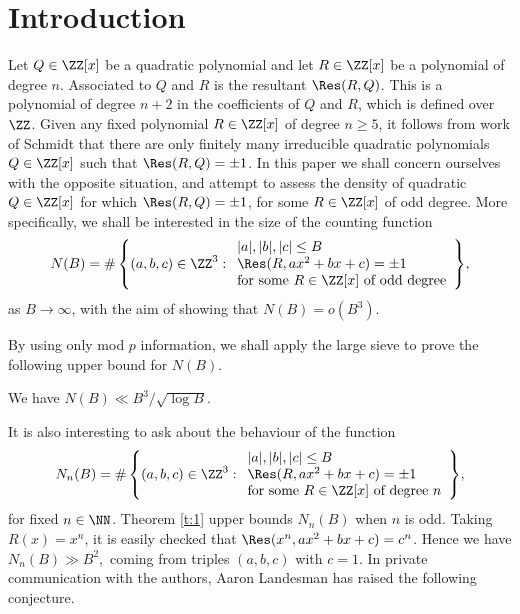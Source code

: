 \section{Introduction}

Let $Q\in \ZZ[x]$ be a quadratic polynomial
and let $R\in \ZZ[x]$ be a polynomial of degree $n$.
Associated to $Q$ and $R$ is the
resultant $\Res(R,Q)$. This is a polynomial of degree $n+2$ in the coefficients of $Q$ and $R$, which is defined over $\ZZ$.
Given any fixed polynomial $R\in \ZZ[x]$ of degree $n\geq 5$, it follows from work of Schmidt \cite[Th.\,1]{Schmidt} that there are only finitely many irreducible quadratic polynomials $Q\in \ZZ[x]$ such that $\Res(R,Q)=\pm 1$.
In this paper we shall concern ourselves with the
opposite situation, and attempt to assess the
density of quadratic $Q\in \ZZ[x]$
for which
$\Res(R,Q)=\pm 1$, for some $R\in \ZZ[x]$ of odd degree.
More specifically, we shall be interested in the size of the counting function
\begin{equation}\label{eq:NB'}
N(B)=\#\left\{(a,b,c)\in \ZZ^3:
\begin{array}{l}
|a|,|b|,|c|\leq B\\
\Res(R,ax^2+bx+c)=\pm 1\\
\text{for some $R\in \ZZ[x]$ of odd degree}
\end{array}
\right\}\!,
\end{equation}
as $B\to \infty$, with the aim of showing that $N(B)=o(B^3)$.

By using only mod $p$ information, we shall apply the large sieve to prove the following upper bound for $N(B)$.

\begin{theorem}\label{t:1}
We have
$
N(B)\ll B^3/\sqrt{\log B}$.
\end{theorem}

It is also interesting to ask about the behaviour of the function
\begin{equation}\label{eq:NB}
N_n(B)=\#\left\{(a,b,c)\in \ZZ^3:
\begin{array}{l}
|a|,|b|,|c|\leq B\\
\Res(R,ax^2+bx+c)=\pm 1\\
\text{for some $R\in \ZZ[x]$ of degree $n$}
\end{array}
\right\}\!,
\end{equation}
for fixed $n\in \NN$.
Theorem \ref{t:1} upper bounds $N_n(B)$ when $n$ is odd.
Taking $R(x)=x^n$, it is easily checked that
$\Res(x^n,ax^2+bx+c)=c^n$. Hence we have
$
N_n(B)\gg B^2,
$
coming from triples $(a,b,c)$ with $c=1$.
In private communication with the authors, Aaron Landesman has raised the following conjecture.

